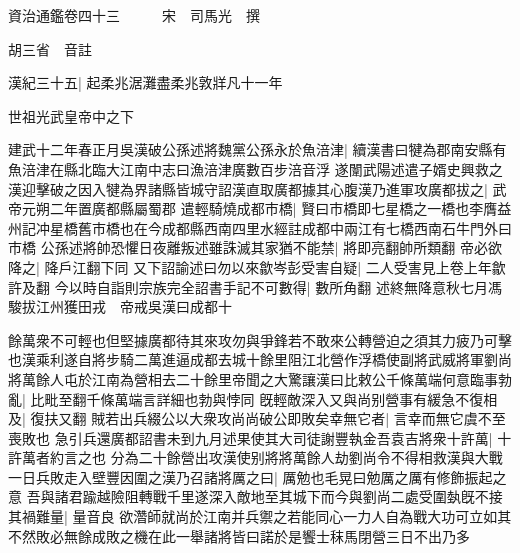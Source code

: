 資治通鑑卷四十三　　　宋　司馬光　撰

胡三省　音註

漢紀三十五|{
	起柔兆涺灘盡柔兆敦牂凡十一年}


世祖光武皇帝中之下

建武十二年春正月吳漢破公孫述將魏黨公孫永於魚涪津|{
	續漢書曰犍為郡南安縣有魚涪津在縣北臨大江南中志曰漁涪津廣數百步涪音浮}
遂闈武陽述遣子婿史興救之漢迎擊破之因入犍為界諸縣皆城守詔漢直取廣都據其心腹漢乃進軍攻廣都拔之|{
	武帝元朔二年置廣都縣屬蜀郡}
遣輕騎燒成都市橋|{
	賢曰市橋即七星橋之一橋也李膺益州記冲星橋舊市橋也在今成都縣西南四里水經註成都中兩江有七橋西南石牛門外曰市橋}
公孫述將帥恐懼日夜離叛述雖誅滅其家猶不能禁|{
	將即亮翻帥所類翻}
帝必欲降之|{
	降戶江翻下同}
又下詔諭述曰勿以來歙岑彭受害自疑|{
	二人受害見上卷上年歙許及翻}
今以時自詣則宗族完全詔書手記不可數得|{
	數所角翻}
述終無降意秋七月馮駿拔江州獲田戎　帝戒吳漢曰成都十

餘萬衆不可輕也但堅據廣都待其來攻勿與爭鋒若不敢來公轉營迫之須其力疲乃可擊也漢乘利遂自將步騎二萬進逼成都去城十餘里阻江北營作浮橋使副將武威將軍劉尚將萬餘人屯於江南為營相去二十餘里帝聞之大驚讓漢曰比敕公千條萬端何意臨事勃亂|{
	比毗至翻千條萬端言詳細也勃與悖同}
旣輕敵深入又與尚别營事有緩急不復相及|{
	復扶又翻}
賊若出兵綴公以大衆攻尚尚破公即敗矣幸無它者|{
	言幸而無它虞不至喪敗也}
急引兵還廣都詔書未到九月述果使其大司徒謝豐執金吾袁吉將衆十許萬|{
	十許萬者約言之也}
分為二十餘營出攻漢使别將將萬餘人劫劉尚令不得相救漢與大戰一日兵敗走入壁豐因圍之漢乃召諸將厲之曰|{
	厲勉也毛晃曰勉厲之厲有修飾振起之意}
吾與諸君踰越險阻轉戰千里遂深入敵地至其城下而今與劉尚二處受圍埶旣不接其禍難量|{
	量音良}
欲濳師就尚於江南并兵禦之若能同心一力人自為戰大功可立如其不然敗必無餘成敗之機在此一舉諸將皆曰諾於是饗士秣馬閉營三日不出乃多

